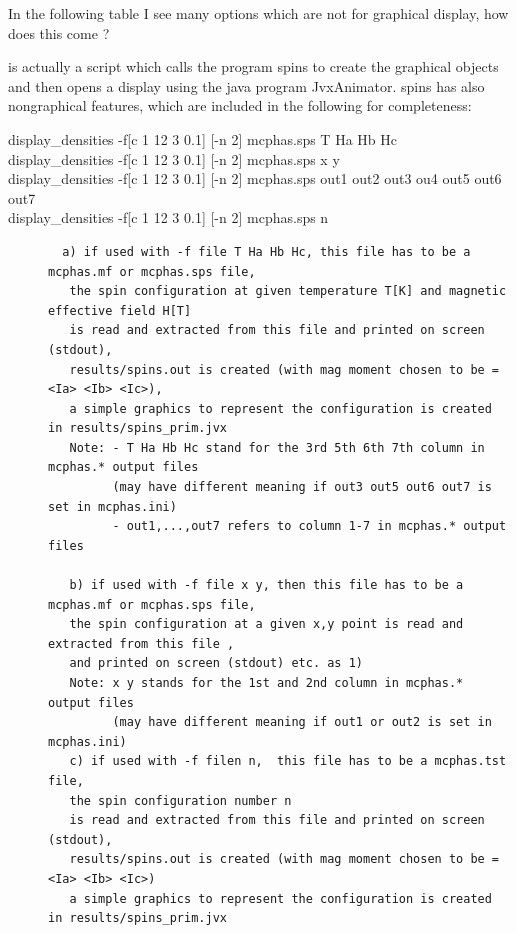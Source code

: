\PP In the following table I see many options which are not for graphical display, how does
this come ?

 is actually a script which calls the program {\prg spins}
to create the graphical objects and then opens a display using the java program
{\prg JvxAnimator}. {\prg spins} has also nongraphical features, which are
included in the following for completeness:

\begin{description} 
\item[ display\_densities -f{[c 1 12 3 0.1]} {[-n 2]} mcphas.sps T Ha Hb Hc]
\item[ display\_densities -f{[c 1 12 3 0.1]} {[-n 2]} mcphas.sps x y]
\item[ display\_densities -f{[c 1 12 3 0.1]} {[-n 2]} mcphas.sps out1 out2 out3 ou4 out5 out6 out7]
\item[ display\_densities -f{[c 1 12 3 0.1]} {[-n 2]} mcphas.sps n]
 \begin{verbatim}
  a) if used with -f file T Ha Hb Hc, this file has to be a mcphas.mf or mcphas.sps file,
   the spin configuration at given temperature T[K] and magnetic effective field H[T]
   is read and extracted from this file and printed on screen (stdout),
   results/spins.out is created (with mag moment chosen to be = <Ia> <Ib> <Ic>),
   a simple graphics to represent the configuration is created in results/spins_prim.jvx 
   Note: - T Ha Hb Hc stand for the 3rd 5th 6th 7th column in mcphas.* output files
         (may have different meaning if out3 out5 out6 out7 is set in mcphas.ini)
         - out1,...,out7 refers to column 1-7 in mcphas.* output files
  
   b) if used with -f file x y, then this file has to be a mcphas.mf or mcphas.sps file,
   the spin configuration at a given x,y point is read and extracted from this file ,
   and printed on screen (stdout) etc. as 1)
   Note: x y stands for the 1st and 2nd column in mcphas.* output files
         (may have different meaning if out1 or out2 is set in mcphas.ini)
   c) if used with -f filen n,  this file has to be a mcphas.tst file,
   the spin configuration number n
   is read and extracted from this file and printed on screen (stdout),
   results/spins.out is created (with mag moment chosen to be = <Ia> <Ib> <Ic>)
   a simple graphics to represent the configuration is created in results/spins_prim.jvx 
  

\end{verbatim}
\end{description}
